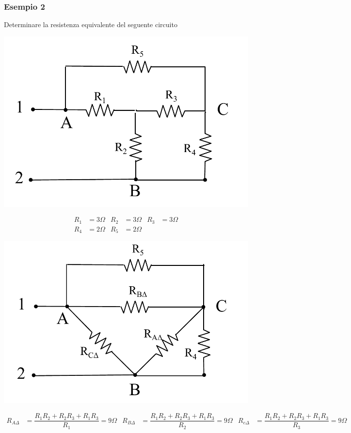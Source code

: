 \documentclass{article}
\begin{document}
\subsubsection*{Esempio 2}
Determinare la resistenza equivalente del seguente circuito
\begin{center}
    \includegraphics[scale=0.3]{Image/Esempio2_1.png}
\end{center}
\begin{align*}
    R_1&=3 \Omega & R_2&=3 \Omega & R_3&=3 \Omega\\
    R_4&=2 \Omega & R_5&=2 \Omega
\end{align*}
\begin{center}
    \includegraphics[scale=0.3]{Image/Esempio2_2.png}
\end{center}
\begin{align*}
    R_{A\Delta} &= \dfrac{R_1R_2 + R_2R_3 +R_1R_3}{R_1} = 9 \Omega
    &
    R_{B\Delta} &= \dfrac{R_1R_2 + R_2R_3 +R_1R_3}{R_2} = 9 \Omega
    &
    R_{c\Delta} &= \dfrac{R_1R_2 + R_2R_3 +R_1R_3}{R_3} = 9 \Omega
\end{align*}
\end{document}
